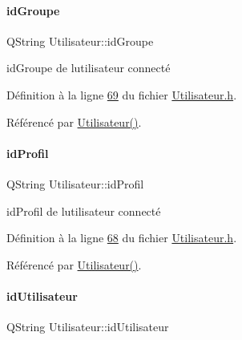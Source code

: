 \mbox{\label{class_utilisateur_a13c3425772da1d5501e6fe4a2f2b8194}} 
\paragraph{\texorpdfstring{id\+Groupe}{idGroupe}}
{\footnotesize\ttfamily Q\+String Utilisateur\+::id\+Groupe\hspace{0.3cm}{\ttfamily [private]}}



id\+Groupe de l\textquotesingle{}utilisateur connecté 



Définition à la ligne \hyperlink{_utilisateur_8h_source_l00069}{69} du fichier \hyperlink{_utilisateur_8h_source}{Utilisateur.\+h}.



Référencé par \hyperlink{_utilisateur_8cpp_source_l00022}{Utilisateur()}.

\mbox{\label{class_utilisateur_a042947e8b86637d1eb012c3fc89a959e}} 
\paragraph{\texorpdfstring{id\+Profil}{idProfil}}
{\footnotesize\ttfamily Q\+String Utilisateur\+::id\+Profil\hspace{0.3cm}{\ttfamily [private]}}



id\+Profil de l\textquotesingle{}utilisateur connecté 



Définition à la ligne \hyperlink{_utilisateur_8h_source_l00068}{68} du fichier \hyperlink{_utilisateur_8h_source}{Utilisateur.\+h}.



Référencé par \hyperlink{_utilisateur_8cpp_source_l00022}{Utilisateur()}.

\mbox{\label{class_utilisateur_ae1763e7a52c82c63506bc4160cdabb20}} 
\paragraph{\texorpdfstring{id\+Utilisateur}{idUtilisateur}}
{\footnotesize\ttfamily Q\+String Utilisateur\+::id\+Utilisateur\hspace{0.3cm}{\ttfamily [private]}}



